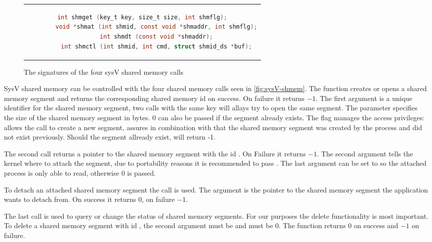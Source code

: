 \begin{figure}[htpb]
	\centering
	\begin{tabular}{c}
		\begin{lstlisting}[language=C]
		int shmget (key_t key, size_t size, int shmflg);
		void *shmat (int shmid, const void *shmaddr, int shmflg);
		int shmdt (const void *shmaddr);
		int shmctl (int shmid, int cmd, struct shmid_ds *buf);
		\end{lstlisting}
	\end{tabular}
	\caption[SysV shmem signatures]{The signatures of the four sysV shared memory calls\cite{unix-programming}}
	\label{fig:sysV-shmem}
\end{figure}

SysV shared memory can be controlled with the four shared memory calls seen in \autoref{fig:sysV-shmem}.
The function  creates or opens a shared memory segment and returns the corresponding shared memory id on success.
On failure it returns $-1$.
The first argument  is a unique identifier for the shared memory segment, two calls with the same key will allays try to open the same segment. 
The parameter  specifies the size of the shared memory segment in bytes.
0 can also be passed if the segment already exists.
The flag  manages the access privileges:  allows the call to create a new segment,  assures in combination with  that the shared memory segment was created by the process and did not exist previously.
Should the segment allready exist,  will return -1\cite{unix-programming}.

The second call  returns a pointer to the shared memory segment with the id . 
On Failure it returns $-1$.
The second argument  tells the kernel where to attach the segment, due to portability reasons it is recommended to pass .
The last argument  can be set to  so the attached process is only able to read, otherwise $0$ is passed\cite{unix-programming}. 
  
To detach an attached shared memory segment the call  is used.
The argument  is the pointer to the shared memory segment the application wants to detach from.
On success it returns $0$, on failure $-1$\cite{unix-programming}.

The last call  is used to query or change the status of shared memory segments.
For our purposes the delete functionality is most important.
To delete a shared memory segment with id , the second argument  must be  and  must be 0.
The function returns $0$ on success and $-1$ on failure\cite{unix-programming}.


